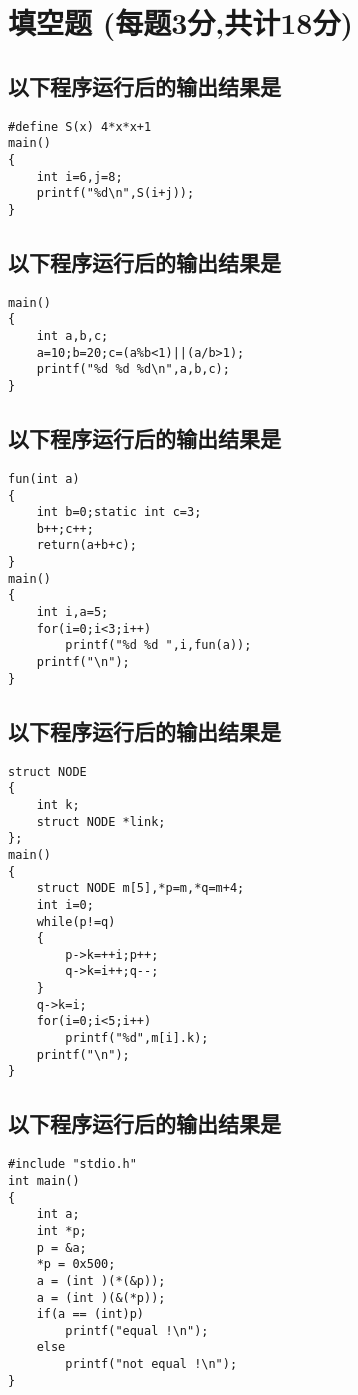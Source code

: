 ﻿\documentclass  [11pt,twocolumn]{article}
\begin{document}

\section{填空题 (每题3分,共计18分)}
\subsection{以下程序运行后的输出结果是\myblank{10em}}
\begin{lstlisting}
#define S(x) 4*x*x+1 
main() 
{ 
    int i=6,j=8; 
    printf("%d\n",S(i+j)); 
} 
\end{lstlisting}

\subsection{以下程序运行后的输出结果是\myblank{10em}}
\begin{lstlisting}
main() 
{ 
    int a,b,c; 
    a=10;b=20;c=(a%b<1)||(a/b>1); 
    printf("%d %d %d\n",a,b,c); 
} 
\end{lstlisting}

\subsection{以下程序运行后的输出结果是\myblank{10em}}
\begin{lstlisting}
fun(int a) 
{
    int b=0;static int c=3; 
    b++;c++; 
    return(a+b+c); 
} 
main() 
{
    int i,a=5; 
    for(i=0;i<3;i++)
        printf("%d %d ",i,fun(a)); 
    printf("\n"); 
} 
\end{lstlisting}

\subsection{以下程序运行后的输出结果是\myblank{10em}}
\begin{lstlisting}
struct NODE 
{
    int k; 
    struct NODE *link; 
}; 
main() 
{ 
    struct NODE m[5],*p=m,*q=m+4; 
    int i=0; 
    while(p!=q) 
    {
        p->k=++i;p++; 
        q->k=i++;q--; 
    } 
    q->k=i; 
    for(i=0;i<5;i++)
        printf("%d",m[i].k); 
    printf("\n"); 
} 
\end{lstlisting}

\subsection{以下程序运行后的输出结果是\myblank{10em}}
\begin{lstlisting}
#include "stdio.h"
int main()
{
    int a;
    int *p;
    p = &a;
    *p = 0x500;
    a = (int )(*(&p));
    a = (int )(&(*p));
    if(a == (int)p)
        printf("equal !\n");
    else
        printf("not equal !\n");
}
\end{lstlisting}
\end{document}
